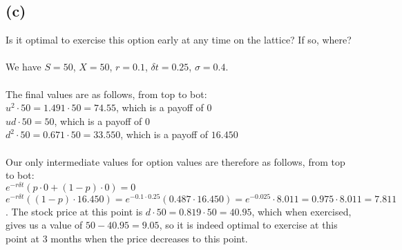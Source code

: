 \documentclass{article}
\begin{document}
{\subsection*{(c)}

Is it optimal to exercise this option early at any time on the lattice? If so, where? \\ \\
We have $S = 50$, $X = 50$, $r = 0.1$, $\delta t = 0.25$, $\sigma = 0.4$. \\ \\
The final values are as follows, from top to bot: \\
$u^2 \cdot 50 = 1.491 \cdot 50 = 74.55$, which is a payoff of $0$ \\
$ud \cdot 50 = 50$, which is a payoff of $0$ \\
$d^2 \cdot 50 = 0.671 \cdot 50 = 33.550$, which is a payoff of $16.450$ \\ \\
Our only intermediate values for option values are therefore as follows, from top to bot: \\
$e^{-r \delta t} (p \cdot 0 + (1-p) \cdot 0) = 0$ \\
$e^{-r \delta t} ((1-p) \cdot 16.450) = e^{-0.1 \cdot 0.25} (0.487 \cdot 16.450) = e^{-0.025} \cdot 8.011 = 0.975 \cdot 8.011 = 7.811$. The stock price at this point is $d \cdot 50 = 0.819 \cdot 50 = 40.95$, which when exercised, gives us a value of $50 - 40.95 = 9.05$, so it is indeed optimal to exercise at this point at 3 months when the price decreases to this point.

}
\end{document}
